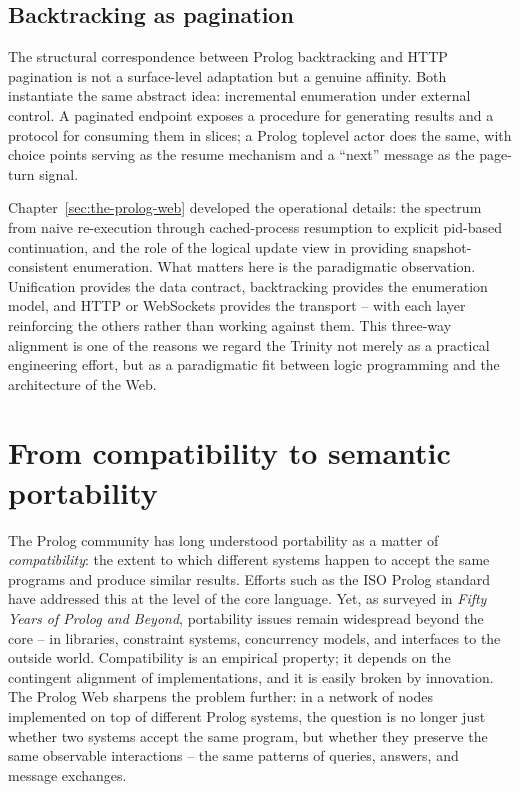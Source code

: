 \subsection{Backtracking as pagination}\label{sec:backtracking-pagination}

The structural correspondence between Prolog backtracking and HTTP
pagination is not a surface-level adaptation but a genuine affinity.
Both instantiate the same abstract idea: incremental enumeration under
external control. A paginated endpoint exposes a procedure for generating results and a protocol for consuming them in slices; a Prolog toplevel actor does the same, with choice points serving as the resume mechanism and a ``next'' message as the page-turn signal.

Chapter~\ref{sec:the-prolog-web} developed the operational details: the spectrum from naive re-execution through cached-process resumption to explicit pid-based continuation, and the role of the logical update view in providing snapshot-consistent enumeration. What matters here is the paradigmatic observation. Unification provides the data contract, backtracking provides the enumeration model, and HTTP or WebSockets provides the transport -- with each layer reinforcing the others rather than working against them. This three-way alignment is one of the reasons we regard the Trinity not merely as a practical engineering effort, but as a paradigmatic fit between logic programming and the architecture of the Web.



\section{From compatibility to semantic portability}\label{sec:semantic-portability}

The Prolog community has long understood portability as a matter of \emph{compatibility}: the extent to which different systems happen to accept the same programs and produce similar results. Efforts such as the ISO Prolog standard have addressed this at the level of the core language. Yet, as surveyed in \emph{Fifty Years of Prolog and Beyond}, portability issues remain widespread beyond the core -- in libraries, constraint systems, concurrency models, and interfaces to the outside world. Compatibility is an empirical property; it depends on the contingent alignment of implementations, and it is easily broken by innovation. The Prolog Web sharpens the problem further: in a network of nodes implemented on top of different Prolog systems, the question is no longer just whether two systems accept the same program, but whether they preserve the same observable interactions -- the same patterns of queries, answers, and message exchanges.


